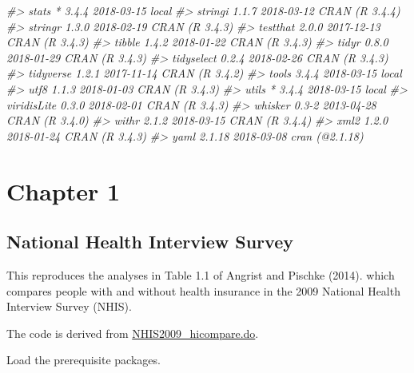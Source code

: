 \documentclass[]{book}
\newenvironment{Shaded}{\begin{snugshade}}{\end{snugshade}}
\newcommand{\CommentTok}[1]{\textcolor[rgb]{0.56,0.35,0.01}{\textit{#1}}}
\theoremstyle{definition}
\theoremstyle{definition}
\theoremstyle{definition}
\theoremstyle{remark}
\begin{document}
\begin{Shaded}
\begin{Highlighting}[]
\CommentTok{#>  stats        * 3.4.4      2018-03-15 local                           }
\CommentTok{#>  stringi        1.1.7      2018-03-12 CRAN (R 3.4.4)                  }
\CommentTok{#>  stringr        1.3.0      2018-02-19 CRAN (R 3.4.3)                  }
\CommentTok{#>  testthat       2.0.0      2017-12-13 CRAN (R 3.4.3)                  }
\CommentTok{#>  tibble         1.4.2      2018-01-22 CRAN (R 3.4.3)                  }
\CommentTok{#>  tidyr          0.8.0      2018-01-29 CRAN (R 3.4.3)                  }
\CommentTok{#>  tidyselect     0.2.4      2018-02-26 CRAN (R 3.4.3)                  }
\CommentTok{#>  tidyverse      1.2.1      2017-11-14 CRAN (R 3.4.2)                  }
\CommentTok{#>  tools          3.4.4      2018-03-15 local                           }
\CommentTok{#>  utf8           1.1.3      2018-01-03 CRAN (R 3.4.3)                  }
\CommentTok{#>  utils        * 3.4.4      2018-03-15 local                           }
\CommentTok{#>  viridisLite    0.3.0      2018-02-01 CRAN (R 3.4.3)                  }
\CommentTok{#>  whisker        0.3-2      2013-04-28 CRAN (R 3.4.0)                  }
\CommentTok{#>  withr          2.1.2      2018-03-15 CRAN (R 3.4.4)                  }
\CommentTok{#>  xml2           1.2.0      2018-01-24 CRAN (R 3.4.3)                  }
\CommentTok{#>  yaml           2.1.18     2018-03-08 cran (@2.1.18)}
\end{Highlighting}
\end{Shaded}

\hypertarget{part-chapter-1}{%
\part{Chapter 1}\label{part-chapter-1}}

\hypertarget{national-health-interview-survey}{%
\chapter{National Health Interview
Survey}\label{national-health-interview-survey}}

This reproduces the analyses in Table 1.1 of Angrist and Pischke (2014).
which compares people with and without health insurance in the 2009
National Health Interview Survey (NHIS).

The code is derived from
\href{http://masteringmetrics.com/wp-content/uploads/2015/01/NHIS2009_hicompare.do}{NHIS2009\_hicompare.do}.

Load the prerequisite packages.
\end{document}

